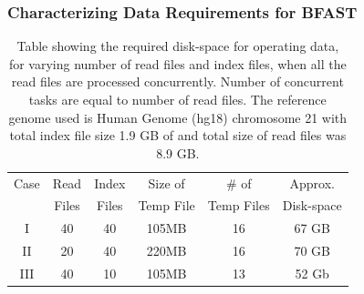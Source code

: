 \documentclass{cpeauth}
\begin{document}


 
\subsubsection{Characterizing Data Requirements for BFAST}




\begin{table}
 \begin{tabular}{|c|c|c|c|c|c|} 
 \hline 
Case &Read& Index& Size of&  \# of & Approx.  \\
 &Files &  Files  & Temp File & Temp Files & Disk-space\\
 \hline
I&40 & 40 &105MB & 16 &67 GB \\
II&20 & 40 & 220MB & 16 &70 GB \\
III&40 & 10 & 105MB & 13 &52 Gb \\ 
 \hline
 \end{tabular}

 \caption{Table showing the required disk-space for operating data,
   for varying number of read files and index files, when all the read
   files are processed concurrently.  Number of concurrent tasks are
   equal to number of read files. The reference genome used is Human
   Genome (hg18) chromosome 21 with total index file size 1.9 GB of and
   total size of read files was 8.9 GB.}
    \label{table:dynamic-diskspace} 
\end{table}
\end{document}

